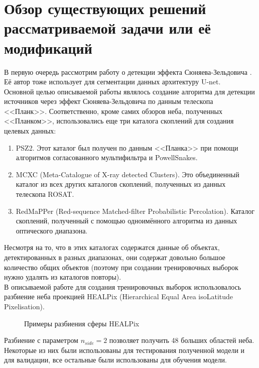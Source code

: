 \chapter{Обзор существующих решений рассматриваемой задачи или её модификаций}
\label{cha:ch_2}

В первую очередь рассмотрим работу о детекции эффекта Сюняева-Зельдовича \cite{Bonjean}. Её автор 
тоже использует для сегментации данных архитектуру U-net. \\

Основной целью описываемой работы являлось создание алгоритма для детекции источников через эффект 
Сюняева-Зельдовича по данным телескопа <<Планк>>. Соответственно, кроме самих обзоров неба, полученных 
<<Планком>>, использовались еще три каталога скоплений для создания целевых данных:

\begin{enumerate}
	\item PSZ2. Этот каталог был получен по данным <<Планка>>  при помощи алгоритмов 
	согласованного мультифильтра и PowellSnakes.
	\item MCXC (Meta-Catalogue of X-ray detected Clusters). Это объединенный каталог из всех 
	других каталогов скоплений, полученных из данных телескопа ROSAT.
	\item RedMaPPer (Red-sequence Matched-filter Probabilistic Percolation). Каталог скоплений, 
	полученный с помощью одноимённого алгоритма из данных оптического диапазона.
\end{enumerate}

Несмотря на то, что в этих каталогах содержатся данные об объектах, детектированных в разных 
диапазонах, они содержат довольно большое количество общих объектов (поэтому при создании 
тренировочных выборок нужно удалять из каталогов повторы). \\

В описываемой работе для создания тренировочных выборок использовалось разбиение неба проекцией 
HEALPix (Hierarchical Equal Area isoLatitude Pixelisation). \\
\begin{figure}[h]
	\caption{Примеры разбиения сферы HEALPix \cite{Healpix}}
\end{figure}

Разбиение с параметром $n_{side}=2$ позволяет получить 48 больших областей неба. Некоторые из них 
были использованы для тестирования полученной модели и для валидации, все остальные были 
использованы для обучения модели.\\ 

